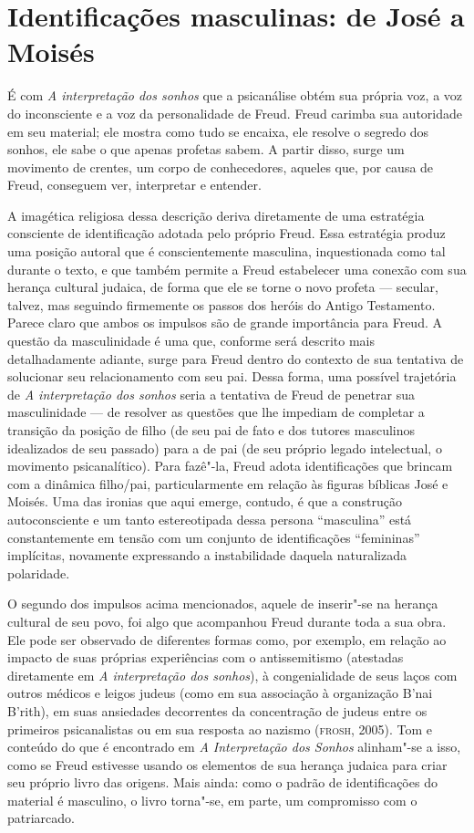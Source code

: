 \section{Identificações masculinas: de José a Moisés}

É com \emph{A interpretação dos sonhos} que a psicanálise obtém sua
própria voz, a voz do inconsciente e a voz da personalidade de Freud.
Freud carimba sua autoridade em seu material; ele mostra como tudo se
encaixa, ele resolve o segredo dos sonhos, ele sabe o que apenas
profetas sabem. A partir disso, surge um movimento de crentes, um corpo
de conhecedores, aqueles que, por causa de Freud, conseguem ver,
interpretar e entender.

A imagética religiosa dessa descrição deriva diretamente de uma
estratégia consciente de identificação adotada pelo próprio Freud. Essa
estratégia produz uma posição autoral que é conscientemente masculina,
inquestionada como tal durante o texto, e que também permite a Freud
estabelecer uma conexão com sua herança cultural judaica, de forma que
ele se torne o novo profeta --- secular, talvez, mas seguindo firmemente
os passos dos heróis do Antigo Testamento. Parece claro que ambos os
impulsos são de grande importância para Freud. A questão da
masculinidade é uma que, conforme será descrito mais detalhadamente
adiante, surge para Freud dentro do contexto de sua tentativa de
solucionar seu relacionamento com seu pai. Dessa forma, uma possível
trajetória de \emph{A interpretação dos sonhos} seria a tentativa de
Freud de penetrar sua masculinidade --- de resolver as questões que lhe
impediam de completar a transição da posição de filho (de seu pai de
fato e dos tutores masculinos idealizados de seu passado) para a de pai
(de seu próprio legado intelectual, o movimento psicanalítico). Para
fazê"-la, Freud adota identificações que brincam com a dinâmica
filho/pai, particularmente em relação às figuras bíblicas José e Moisés.
Uma das ironias que aqui emerge, contudo, é que a construção
autoconsciente e um tanto estereotipada dessa persona ``masculina'' está
constantemente em tensão com um conjunto de identificações ``femininas''
implícitas, novamente expressando a instabilidade daquela naturalizada
polaridade.

O segundo dos impulsos acima mencionados, aquele de inserir"-se na
herança cultural de seu povo, foi algo que acompanhou Freud durante toda
a sua obra. Ele pode ser observado de diferentes formas como, por
exemplo, em relação ao impacto de suas próprias experiências com o
antissemitismo (atestadas diretamente em \emph{A interpretação dos
sonhos}), à congenialidade de seus laços com outros médicos e leigos
judeus (como em sua associação à organização B'nai B'rith), em suas
ansiedades decorrentes da concentração de judeus entre os primeiros
psicanalistas ou em sua resposta ao nazismo (\textsc{frosh}, 2005). Tom e
conteúdo do que é encontrado em \emph{A Interpretação dos Sonhos}
alinham"-se a isso, como se Freud estivesse usando os elementos de sua
herança judaica para criar seu próprio livro das origens. Mais ainda:
como o padrão de identificações do material é masculino, o livro
torna"-se, em parte, um compromisso com o patriarcado.

